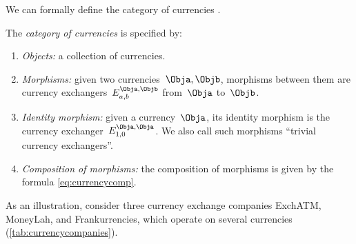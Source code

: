 
We can formally define the category of currencies \Curr.

\begin{definition}
    \label{def:Curr}
    The \emph{category of currencies} \Curr is specified by:
    \begin{enumerate}
        \item \emph{Objects:} a collection of currencies.
        \item \emph{Morphisms:} given two currencies~$\Obja, \Objb$, morphisms between them are currency exchangers~$E_{a,b}^{\Obja,\Objb}$ from~$\Obja$ to~$\Objb$.
        \item \emph{Identity morphism:} given a currency~$\Obja$, its identity morphism is the currency exchanger~$E_{1,0}^{\Obja,\Obja}$.
        We also call such morphisms ``trivial currency exchangers''.
        \item \emph{Composition of morphisms:} the composition of morphisms is given by the formula \cref{eq:currencycomp}.
    \end{enumerate}
\end{definition}

As an illustration, consider three currency exchange companies ExchATM, MoneyLah, and Frankurrencies, which operate on several currencies (\cref{tab:currencycompanies}).

